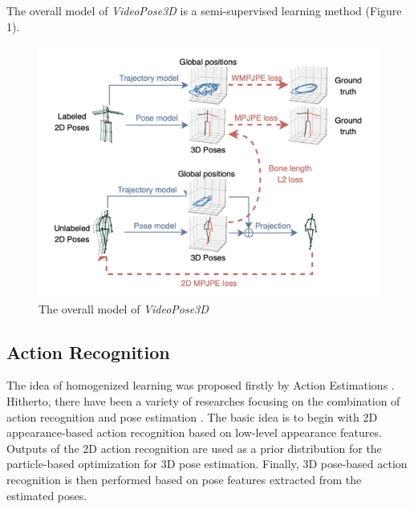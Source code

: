 \documentclass[10pt,twocolumn,letterpaper]{article}
\begin{document}
The overall model of \textit{VideoPose3D} is a semi-supervised learning method (Figure 1). 

\begin{figure}[H]
	\begin{center}
  		\includegraphics[width=0.9\linewidth]{original.png}
	\end{center}
   	\caption{The overall model of \textit{VideoPose3D}}
	\label{fig:long}
	\label{fig:onecol}
\end{figure}

\subsection{Action Recognition}

The idea of homogenized learning was proposed firstly by Action Estimations \cite{wang2013action}. 
Hitherto, there have been a variety of researches focusing on the combination of action recognition and pose
estimation \cite{yao2012coupled}. The basic idea is to begin with 2D appearance-based action recognition
based on low-level appearance features. Outputs of the 2D action recognition are used as a prior distribution
for the particle-based optimization for 3D pose estimation. Finally, 3D pose-based action recognition is then 
performed based on pose features extracted from the estimated poses.
\end{document}
